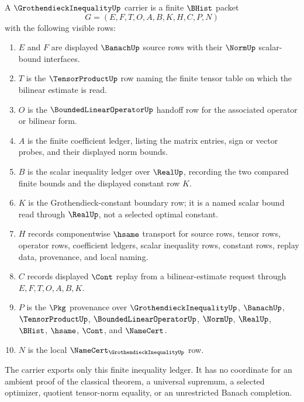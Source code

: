 \begin{definition}
\label{def:grothendieck-inequality-carrier}
A $\GrothendieckInequalityUp$ carrier is a finite $\BHist$ packet
$$
G=(E,F,T,O,A,B,K,H,C,P,N)
$$
with the following visible rows:
\begin{enumerate}
\item $E$ and $F$ are displayed $\BanachUp$ source rows with their $\NormUp$ scalar-bound interfaces.
\item $T$ is the $\TensorProductUp$ row naming the finite tensor table on which the bilinear estimate is read.
\item $O$ is the $\BoundedLinearOperatorUp$ handoff row for the associated operator or bilinear form.
\item $A$ is the finite coefficient ledger, listing the matrix entries, sign or vector probes, and their displayed norm bounds.
\item $B$ is the scalar inequality ledger over $\RealUp$, recording the two compared finite bounds and the displayed constant row $K$.
\item $K$ is the Grothendieck-constant boundary row; it is a named scalar bound read through $\RealUp$, not a selected optimal constant.
\item $H$ records componentwise $\hsame$ transport for source rows, tensor rows, operator rows, coefficient ledgers, scalar inequality rows, constant rows, replay data, provenance, and local naming.
\item $C$ records displayed $\Cont$ replay from a bilinear-estimate request through $E,F,T,O,A,B,K$.
\item $P$ is the $\Pkg$ provenance over $\GrothendieckInequalityUp$, $\BanachUp$, $\TensorProductUp$, $\BoundedLinearOperatorUp$, $\NormUp$, $\RealUp$, $\BHist$, $\hsame$, $\Cont$, and $\NameCert$.
\item $N$ is the local $\NameCert_{\GrothendieckInequalityUp}$ row.
\end{enumerate}
The carrier exports only this finite inequality ledger. It has no coordinate for an ambient proof of the classical theorem, a universal supremum, a selected optimizer, quotient tensor-norm equality, or an unrestricted Banach completion.
\end{definition}


